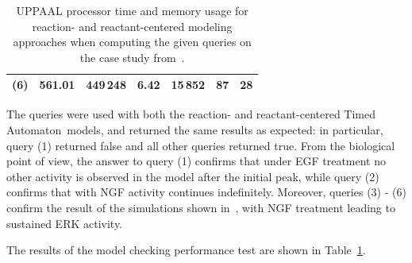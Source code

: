 \documentclass{llncs}
\newcommand{\ta}{Timed Automaton}
\begin{document}
\begin{table}[htbp]
\begin{center}
\begin{tabular}{|c||r|r||r|r||r|r|}
      \hline
      (6) & 561.01 & 449\,{}248 & 6.42 & 15\,{}852 & 87 & 28 \\ %
      \hline
    \end{tabular}
  \end{center}
  \caption{UPPAAL processor time and memory usage for reaction- and reactant-centered modeling approaches when computing
  the given queries on the case study from~\cite{animo-ieee}.\label{tab:model-checking}}
\vspace{-.5cm}
\end{table}

The queries were used with both the reaction- and reactant-centered \ta\ models,
and returned the same results as expected: in particular, query (1) returned false and all other queries returned true.
From the biological point of view, the answer to query (1) confirms that under EGF treatment no other activity is observed in the model after the initial peak,
while query (2) confirms that with NGF activity continues indefinitely.
Moreover, queries (3) - (6) confirm the result of the simulations shown in~\cite{animo-ieee}, with NGF treatment leading to sustained ERK activity.

The results of the model checking performance test are shown in Table~\ref{tab:model-checking}.
\end{document}

